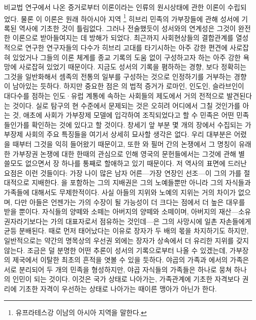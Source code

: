 비교법 연구에서 나온 증거로부터
 이론이라는
인류의 원시상태에 관한 이론이 수립되었다.
물론 이 이론은 원래 하아시아 지역%
\footnote{유프라테스강 이남의 아시아 지역을 말한다.}
히브리 민족의 가부장들에 관해 성서에 기록된 역사에 기초한 것이 틀림없다.
그러나 전술했듯이 성서와의 연계성은 그것이 완전한 이론으로
받아들여지는 데 방해가 되었다.
최근까지 사회현상들의 결합관계를 열성적으로 연구한 연구자들의 다수가
히브리 고대를 타기시하는 아주 강한 편견에 사로잡혀 있었거나
그들의 이론 체계를
종교 기록의 도움 없이
구성하고자 하는
아주 강한 욕망에 사로잡혀 있었기 때문이다.
지금도 성서의 기록을 폄하하는 경향,
보다 정확히는 그것을 일반화해서
셈족의 전통의 일부를 구성하는 것으로 인정하기를 거부하는
경향이 남아있는 듯하다.
하지만 중요한 점은 의 법적 증거가
로마인, 인도인, 슬라브인이 대다수를 점하는
인도^^b7유럽 계통에 속하는 사회들의 제도에서 거의 전적으로 발견된다는 것이다.
실로 탐구의 현 수준에서 문제되는 것은 오히려 어디에서 그칠 것인가를 아는 것,
애초에 사회가 가부장제 모델에 입각하여 조직되었다고 할 수 
민족은 어떤 민족들인가를 확인하는 것에 있다고 할 것이다.
창세기 앞 부분 몇 개의 장에서 수집되는 가부장제 사회의 주요 특징들을
여기서 상세히 묘사할 생각은 없다.
우리 대부분은 어렸을 때부터 그것을 익히 들어왔기 때문이고, 또한
와 필머 간의 논쟁에서 그 명칭이 유래한 가부장권 논쟁에 대한
한때의 관심으로 인해
영국의 문헌들에서는
그것에 관해
별 쓸모도 없으면서
장 하나를 통째로 할애하고 있기 때문이다.
저 역사의 표면에 드러난 요점은 이런 것들이다:
가장 나이 많은 남자 어른---가장 연장인 선조---이 그의 가를
절대적으로 지배한다.
을 포함하는 그의 지배권은 그의 노예들뿐만 아니라
그의 자식들과 가족들에 대해서도 무제한적이다.
사실 아들의 지위와 노예의 지위는 거의 차이가 없으며,
다만 아들은 언젠가는 가의 수장이 될 가능성이 더 크다는 점에서 더 높은 대우를
받을 뿐이다.
자식들의 양떼와 소떼는 아버지의 양떼와 소떼이며,
아버지의 재산---소유권자라기보다는 가의 대표자로서 점유하는 것인데---은
그의 사망시에 일촌 자손들에게 균등 분배된다.
때로 먼저 태어났다는 이유로 장자가 두 배의 몫을 차지하기도 하지만,
일반적으로는 약간의 명목상의 우선권 외에는 장자가 상속에서 더 유리한
지위를 갖지 않는다.
조금은 덜 분명한 어떤 추론이 성서의 기록으로부터 나올 수 있겠는데,
가부장의 제국에서 이탈한 최초의 흔적을 엿볼 수 있을 듯하다.
야곱의 가족과 에서의 가족은 서로 분리되어 두 개의 민족을 형성하지만,
야곱 자식들의 가족들은 하나로 뭉쳐 하나의 인민이 되는 것이다.
이것은 국가 상태로 나아가는,
가족관계에 기초한 자격보다 권리에 기초한 자격이 우선하는 상태로 나아가는
때이른 맹아가 아닌가 한다.

